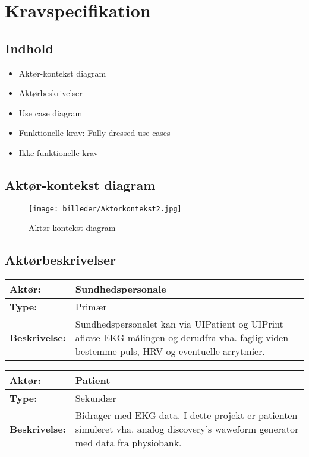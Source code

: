 \chapter{Kravspecifikation}
\section{Indhold}
\begin{itemize}[label=$\circ$]
\item{Aktør-kontekst diagram}
\item{Aktørbeskrivelser}
\item{Use case diagram}
\item{Funktionelle krav: Fully dressed use cases}
\item{Ikke-funktionelle krav}
\end{itemize}

\section{Aktør-kontekst diagram}
\begin{figure}[H]
\centering
\texttt{[image: billeder/Aktorkontekst2.jpg]}
\caption{Aktør-kontekst diagram}
\label{fig:aktør-kontekst}
\end{figure}
\newpage

\section{Aktørbeskrivelser}
\begin{table}[H]
\begin{tabular}{|l|p{13cm}|}
\hline
\textbf{Aktør:} & \textbf{Sundhedspersonale}\\\hline
\textbf{Type:} & Primær \\\hline
\textbf{Beskrivelse:} & Sundhedspersonalet kan via UIPatient og UIPrint aflæse EKG-målingen og derudfra vha. faglig viden bestemme puls, HRV og eventuelle arrytmier. \\\hline
\end{tabular}
\end{table}

\begin{table}[H]
\begin{tabular}{|l|p{13cm}|}
\hline
\textbf{Aktør:} & \textbf{Patient}\\\hline
\textbf{Type:} & Sekundær \\\hline
\textbf{Beskrivelse:} & Bidrager med EKG-data. I dette projekt er patienten simuleret vha. analog discovery's waweform generator med data fra physiobank. \\\hline
\end{tabular}
\end{table}

